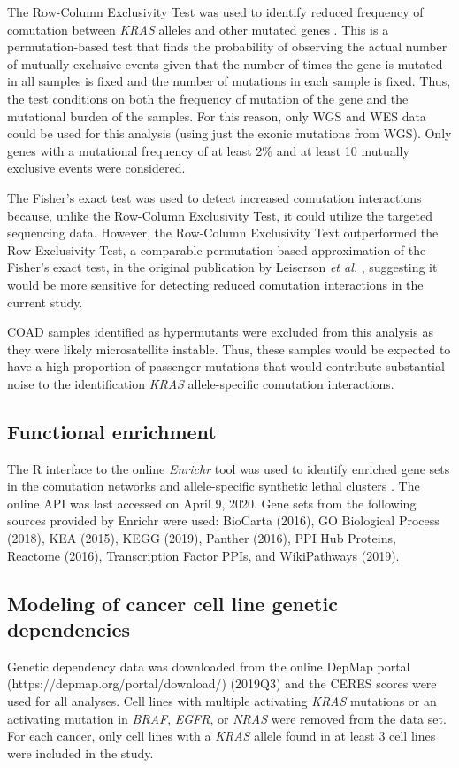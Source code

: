 \documentclass[english, 10pt, letterpaper]{article}
\newcommand{\KRAS}{\emph{KRAS}}
\begin{document}
The Row-Column Exclusivity Test was used to identify reduced frequency of comutation between \KRAS{} alleles and other mutated genes \cite{Leiserson2016}.
This is a permutation-based test that finds the probability of observing the actual number of mutually exclusive events given that the number of times the gene is mutated in all samples is fixed and the number of mutations in each sample is fixed.
Thus, the test conditions on both the frequency of mutation of the gene and the mutational burden of the samples.
For this reason, only WGS and WES data could be used for this analysis (using just the exonic mutations from WGS).
Only genes with a mutational frequency of at least 2\% and at least 10 mutually exclusive events were considered.

The Fisher's exact test was used to detect increased comutation interactions because, unlike the Row-Column Exclusivity Test, it could utilize the targeted sequencing data.
However, the Row-Column Exclusivity Text outperformed the Row Exclusivity Test, a comparable permutation-based approximation of the Fisher's exact test, in the original publication by Leiserson \emph{et al.} \cite{Leiserson2016}, suggesting it would be more sensitive for detecting reduced comutation interactions in the current study.

COAD samples identified as hypermutants were excluded from this analysis as they were likely microsatellite instable.
Thus, these samples would be expected to have a high proportion of passenger mutations that would contribute substantial noise to the identification \KRAS{} allele-specific comutation interactions.


\subsection*{Functional enrichment}
The R interface to the online \emph{Enrichr} tool was used to identify enriched gene sets in the comutation networks and allele-specific synthetic lethal clusters \cite{Chen2013, Kuleshov2016Enrichr:Update., R-enrichR}.
The online API was last accessed on April 9, 2020.
Gene sets from the following sources provided by Enrichr were used: BioCarta (2016), GO Biological Process (2018), KEA (2015), KEGG (2019), Panther (2016), PPI Hub Proteins, Reactome (2016), Transcription Factor PPIs, and WikiPathways (2019).


\subsection*{Modeling of cancer cell line genetic dependencies}
Genetic dependency data was downloaded from the online DepMap portal (https://depmap.org/portal/download/) (2019Q3) and the CERES scores were used for all analyses.
Cell lines with multiple activating \KRAS{} mutations or an activating mutation in \emph{BRAF}, \emph{EGFR}, or \emph{NRAS} were removed from the data set.
For each cancer, only cell lines with a \KRAS{} allele found in at least 3 cell lines were included in the study.
\end{document}
